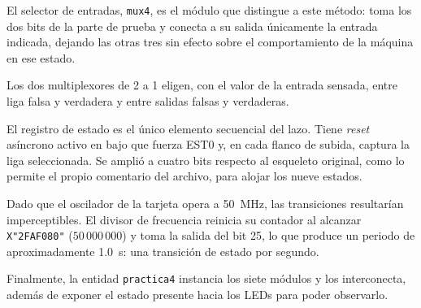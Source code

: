 
\label{fig:divisor}

El selector de entradas, \texttt{mux4}, es el módulo que distingue a este método: toma los
dos bits de la parte de prueba y conecta a su salida únicamente la entrada indicada,
dejando las otras tres sin efecto sobre el comportamiento de la máquina en ese estado.


\label{fig:mux4}

Los dos multiplexores de 2 a 1 eligen, con el valor de la entrada sensada, entre liga
falsa y verdadera y entre salidas falsas y verdaderas.


\label{fig:mux23}


\label{fig:mux24}

El registro de estado es el único elemento secuencial del lazo. Tiene \textit{reset}
asíncrono activo en bajo que fuerza EST0 y, en cada flanco de subida, captura la liga
seleccionada. Se amplió a cuatro bits respecto al esqueleto original, como lo permite el
propio comentario del archivo, para alojar los nueve estados.


\label{fig:register}

Dado que el oscilador de la tarjeta opera a 50~MHz, las transiciones resultarían
imperceptibles. El divisor de frecuencia reinicia su contador al alcanzar
\texttt{X"2FAF080"} ($50\,000\,000$) y toma la salida del bit 25, lo que produce un periodo
de aproximadamente 1.0~s: una transición de estado por segundo.


\label{fig:divfrec}

Finalmente, la entidad \texttt{practica4} instancia los siete módulos y los interconecta,
además de exponer el estado presente hacia los LEDs para poder observarlo.


\label{fig:top}

